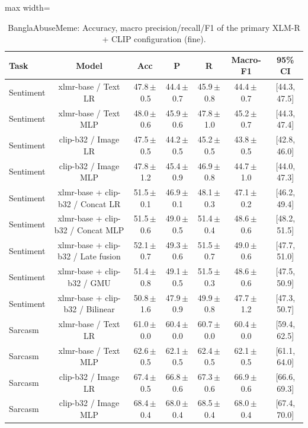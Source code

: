 \begin{table}[t]
\centering
\small
\caption{BanglaAbuseMeme: Accuracy, macro precision/recall/F1 of the primary XLM-R + CLIP configuration (fine).}
\label{tab:primary_fine_banglaabusememe}
\begin{adjustbox}{max width=\textwidth}
\begin{tabular}{lcccccc}
\toprule
Task & Model & Acc & P & R & Macro-F1 & 95\% CI \\
\midrule
Sentiment & xlmr-base / Text LR & 47.8\,$\pm$\,0.5 & 44.4\,$\pm$\,0.7 & 45.9\,$\pm$\,0.8 & 44.4\,$\pm$\,0.7 & [44.3, 47.5] \\
Sentiment & xlmr-base / Text MLP & 48.0\,$\pm$\,0.6 & 45.9\,$\pm$\,0.6 & 47.8\,$\pm$\,1.0 & 45.2\,$\pm$\,0.7 & [44.3, 47.4] \\
Sentiment & clip-b32 / Image LR & 47.5\,$\pm$\,0.5 & 44.2\,$\pm$\,0.5 & 45.2\,$\pm$\,0.5 & 43.8\,$\pm$\,0.5 & [42.8, 46.0] \\
Sentiment & clip-b32 / Image MLP & 47.8\,$\pm$\,1.2 & 45.4\,$\pm$\,0.9 & 46.9\,$\pm$\,0.8 & 44.7\,$\pm$\,1.0 & [44.0, 47.3] \\
Sentiment & xlmr-base + clip-b32 / Concat LR & 51.5\,$\pm$\,0.1 & 46.9\,$\pm$\,0.1 & 48.1\,$\pm$\,0.3 & 47.1\,$\pm$\,0.2 & [46.2, 49.4] \\
Sentiment & xlmr-base + clip-b32 / Concat MLP & 51.5\,$\pm$\,0.6 & 49.0\,$\pm$\,0.5 & 51.4\,$\pm$\,0.4 & 48.6\,$\pm$\,0.6 & [48.2, 51.5] \\
Sentiment & xlmr-base + clip-b32 / Late fusion & 52.1\,$\pm$\,0.7 & 49.3\,$\pm$\,0.6 & 51.5\,$\pm$\,0.7 & 49.0\,$\pm$\,0.6 & [47.7, 51.0] \\
Sentiment & xlmr-base + clip-b32 / GMU & 51.4\,$\pm$\,0.8 & 49.1\,$\pm$\,0.5 & 51.5\,$\pm$\,0.3 & 48.6\,$\pm$\,0.6 & [47.5, 50.9] \\
Sentiment & xlmr-base + clip-b32 / Bilinear & 50.8\,$\pm$\,1.6 & 47.9\,$\pm$\,0.9 & 49.9\,$\pm$\,0.8 & 47.7\,$\pm$\,1.2 & [47.3, 50.7] \\
Sarcasm & xlmr-base / Text LR & 61.0\,$\pm$\,0.0 & 60.4\,$\pm$\,0.0 & 60.7\,$\pm$\,0.0 & 60.4\,$\pm$\,0.0 & [59.4, 62.5] \\
Sarcasm & xlmr-base / Text MLP & 62.6\,$\pm$\,0.5 & 62.1\,$\pm$\,0.5 & 62.4\,$\pm$\,0.5 & 62.1\,$\pm$\,0.5 & [61.1, 64.0] \\
Sarcasm & clip-b32 / Image LR & 67.4\,$\pm$\,0.5 & 66.8\,$\pm$\,0.6 & 67.3\,$\pm$\,0.6 & 66.9\,$\pm$\,0.6 & [66.6, 69.3] \\
Sarcasm & clip-b32 / Image MLP & 68.4\,$\pm$\,0.4 & 68.0\,$\pm$\,0.4 & 68.5\,$\pm$\,0.4 & 68.0\,$\pm$\,0.4 & [67.4, 70.0] \\

\end{tabular}
\end{adjustbox}
\end{table}

